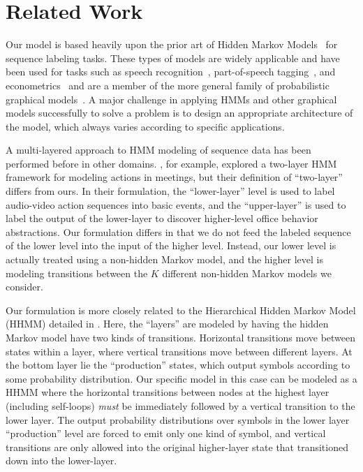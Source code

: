 \section{Related Work}

Our model is based heavily upon the prior art of Hidden Markov
Models~\cite{Rabiner:1990:RSR} for sequence labeling tasks. These types of
models are widely applicable and have been used for tasks such as speech
recognition~\cite{Huang:1990:HMM}, part-of-speech
tagging~\cite{Jurafsky:2009:SLP}, and econometrics~\cite{Hamilton:1990:JoE}
and are a member of the more general family of probabilistic graphical
models~\cite{Koller:2009:PGM}.  A major challenge in applying HMMs and
other graphical models successfully to solve a problem is to design an
appropriate architecture of the model, which always varies according to
specific applications.

A multi-layered approach to HMM modeling of sequence data has been
performed before in other domains. \citet{Zhang:2004:CVPR}, for example,
explored a two-layer HMM framework for modeling actions in meetings, but
their definition of ``two-layer'' differs from ours. In their formulation,
the ``lower-layer'' level is used to label audio-video action sequences
into basic events, and the ``upper-layer'' is used to label the output of
the lower-layer to discover higher-level office behavior abstractions. Our
formulation differs in that we do not feed the labeled sequence of the
lower level into the input of the higher level. Instead, our lower level is
actually treated using a non-hidden Markov model, and the higher level is
modeling transitions between the $K$ different non-hidden Markov models we
consider.

Our formulation is more closely related to the Hierarchical Hidden Markov
Model (HHMM) detailed in \citet{Fine:1998:ML}. Here, the ``layers'' are
modeled by having the hidden Markov model have two kinds of transitions.
Horizontal transitions move between states within a layer, where vertical
transitions move between different layers. At the bottom layer lie the
``production'' states, which output symbols according to some probability
distribution. Our specific model in this case can be modeled as a HHMM
where the horizontal transitions between nodes at the highest layer
(including self-loops) \emph{must} be immediately followed by a vertical
transition to the lower layer. The output probability distributions over
symbols in the lower layer ``production'' level are forced to emit only one
kind of symbol, and vertical transitions are only allowed into the original
higher-layer state that transitioned down into the lower-layer.

